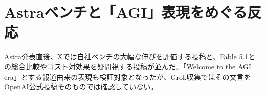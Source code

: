 \section{Astraベンチと「AGI」表現をめぐる反応}

Astra発表直後、Xでは自社ベンチの大幅な伸びを評価する投稿と、Fable 5.1との総合比較やコスト対効果を疑問視する投稿が並んだ。「Welcome to the AGI era」とする報道由来の表現も検証対象となったが、Grok収集ではその文言をOpenAI公式投稿そのものでは確認していない。


